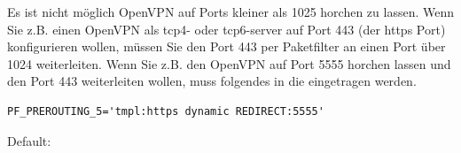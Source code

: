 \begin{description}
  Es ist nicht möglich OpenVPN auf Ports kleiner als 1025 horchen zu
  lassen. Wenn Sie z.B. einen OpenVPN als tcp4- oder tcp6-server auf Port 443
  (der https Port) konfigurieren wollen, müssen Sie den Port 443 per
  Paketfilter an einen Port über 1024 weiterleiten. Wenn Sie z.B. den
  OpenVPN auf Port 5555 horchen lassen und den Port 443 weiterleiten
  wollen, muss folgendes in die  eingetragen werden.

\begin{example}
\begin{verbatim}
PF_PREROUTING_5='tmpl:https dynamic REDIRECT:5555'
\end{verbatim}
\end{example}


  Default: 


\end{description}
